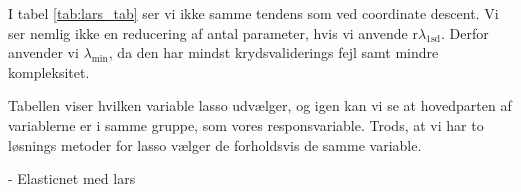 I tabel \ref{tab:lars_tab} ser vi ikke samme tendens som ved coordinate descent. 
Vi ser nemlig ikke en reducering af antal parameter, hvis vi anvende r$\lambda_{1\text{sd}}$.
Derfor anvender vi $\lambda_{\min}$, da den har mindst krydsvaliderings fejl samt mindre kompleksitet. 





Tabellen viser hvilken variable lasso udvælger, og igen kan vi se at hovedparten af variablerne er i samme gruppe, som vores responsvariable. 
Trods, at vi har to løsnings metoder for lasso vælger de forholdsvis de samme variable.

- Elasticnet med lars 
